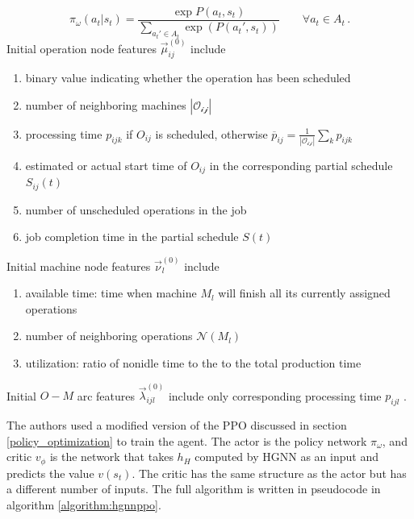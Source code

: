 \begin{equation}
    \pi_\omega (a_t|s_t) = \frac{\exp{P(a_t,s_t)}}{\sum_{a_t'\in A_t}\exp(P(a_t',s_t))} \hspace{2em} \forall a_t \in A_t \, . 
\end{equation}
Initial operation node features $\vec{\mu}_{ij}^{(0)}$ include \cite{9826438}
\begin{enumerate}
    \item  binary value indicating whether the operation has been scheduled
    \item number of neighboring machines $|\mathcal{O_{ij}}|$
    \item processing time $p_{ijk}$ if $O_{ij}$ is scheduled, otherwise $\overline{p}_{ij} = \frac{1}{|\mathcal{O_{ij}}|}\sum_k p_{ijk}$
    \item estimated or actual start time of $O_{ij}$ in the corresponding partial schedule $S_{ij}(t)$
    \item number of unscheduled operations in the job
    \item job completion time in the partial schedule $S(t)$
\end{enumerate}
Initial machine node features $\vec{\nu}_{l}^{(0)}$ include \cite{9826438}
\begin{enumerate}
    \item available time: time when machine $M_l$ will finish all its currently assigned operations
    \item number of neighboring operations $\mathcal{N}(M_l)$
    \item utilization: ratio of nonidle time to the to the total production time
\end{enumerate}
Initial $O-M$ arc features $\vec{\lambda}_{ijl}^{(0)}$ include only corresponding processing time $p_{ijl}$ \cite{9826438}.
\par
The authors used a modified version of the PPO discussed in section \ref{policy_optimization} to train the agent. The actor is the policy network $\pi_\omega$, and critic $v_\phi$ is the network that takes $h_H$ computed by HGNN as an input and predicts the value $v(s_t)$. The critic has the same structure as the actor but has a different number of inputs. The full algorithm is written in pseudocode in algorithm \ref{algorithm:hgnnppo}. 

